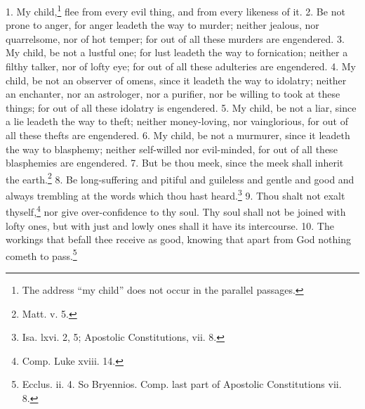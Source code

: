 1. My child,\footnote{\par  The address “my child” does not occur in the parallel passages.} flee from every evil thing, and from every likeness of it. 2. Be not prone to anger, for anger leadeth the way to murder; neither jealous, nor quarrelsome, nor of hot temper; for out of all these murders are engendered. 3. My child, be not a lustful one; for lust leadeth the way to fornication; neither a filthy talker, nor of lofty eye; for out of all these adulteries are engendered. 4. My child, be not an observer of omens, since it leadeth the way to idolatry; neither an enchanter, nor an astrologer, nor a purifier, nor be willing to took at these things; for out of all these idolatry is engendered. 5. My child, be not a liar, since a lie leadeth the way to theft; neither money-loving, nor vainglorious, for out of all these thefts are engendered. 6. My child, be not a murmurer, since it leadeth the way to blasphemy; neither self-willed nor evil-minded, for out of all these blasphemies are engendered. 7. But be thou meek, since the meek shall inherit the earth.\footnote{\par  Matt. v. 5.} 8. Be long-suffering and pitiful and guileless and gentle and good and always trembling at the words which thou hast heard.\footnote{\par  Isa. lxvi. 2, 5; Apostolic Constitutions, vii. 8.} 9. Thou shalt not exalt thyself,\footnote{\par  Comp. Luke xviii. 14.} nor give over-confidence to thy soul. Thy soul shall not be joined with lofty ones, but with just and lowly ones shall it have its intercourse. 10. The workings that befall thee receive as good, knowing that apart from God nothing cometh to pass.\footnote{\par  Ecclus. ii. 4. So Bryennios. Comp. last part of Apostolic Constitutions vii. 8.}


